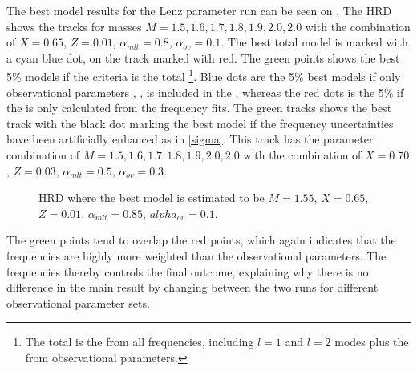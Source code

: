The best model results for the Lenz parameter run can be seen on . The HRD shows the tracks for masses $M = 1.5,1.6,1.7,1.8,1.9,2.0,2.0$ with the combination of $X=0.65 $, $Z= 0.01$, $\alpha_{mlt} = 0.8$, $\alpha_{ov} = 0.1$. The best total model is marked with a cyan blue dot, on the track marked with red. The green points shows the best 5\% models if the criteria is the total \chis\footnote{The total \chis is the \chis from all frequencies, including $l=1$ and $l=2$ modes plus the \chis from observational parameters.}. Blue dots are the 5\% best models if only observational parameters \logg, \teff, \lum is included in the \chis, whereas the red dots is the 5\% if the \chis is only calculated from the frequency fits. The green tracks shows the best track with the black dot marking the best model if the frequency uncertainties have been artificially enhanced as in \eqref{sigma}. This track has the parameter combination of $M = 1.5,1.6,1.7,1.8,1.9,2.0,2.0$ with the combination of $X = 0.70$, $Z=0.03$, $\alpha_{mlt}=0.5$, $\alpha_{ov}=0.3$. 
\begin{figure}[htbp]
	\centering
	\caption{HRD where the best model is estimated to be $M=1.55$\msun, $X=0.65$, $Z=0.01$, $\alpha_{mlt} = 0.85$, $alpha_{ov} = 0.1$.}
	\label{hrd44taulenz}
\end{figure}
The green points tend to overlap the red points, which again indicates that the frequencies are highly more weighted than the observational parameters. The frequencies thereby controls the final outcome, explaining why there is no difference in the main result by changing between the two runs for different observational parameter sets. 
